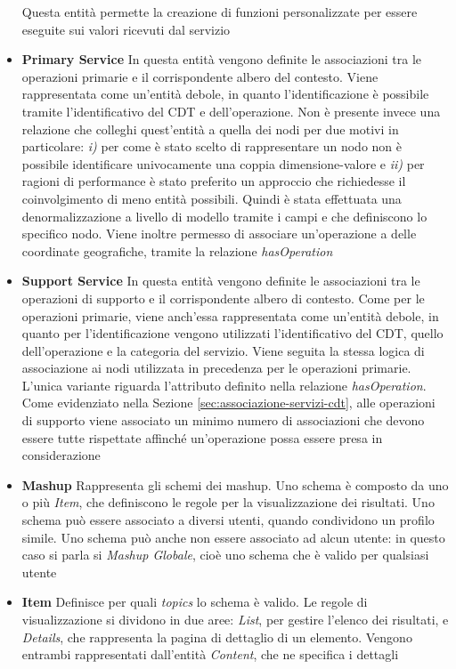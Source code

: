 \begin{itemize}
	Questa entità permette la creazione di funzioni personalizzate per essere eseguite sui valori ricevuti dal servizio
	\item \textbf{Primary Service}
	In questa entità vengono definite le associazioni tra le operazioni primarie e il corrispondente albero del contesto. Viene rappresentata come un'entità debole, in quanto l'identificazione è possibile tramite l'identificativo del CDT e dell'operazione. Non è presente invece una relazione che colleghi quest'entità a quella dei nodi per due motivi in particolare: \emph{i)} per come è stato scelto di rappresentare un nodo non è possibile identificare univocamente una coppia dimensione-valore e \emph{ii)} per ragioni di performance è stato preferito un approccio che richiedesse il coinvolgimento di meno entità possibili. Quindi è stata effettuata una denormalizzazione a livello di modello tramite i campi  e  che definiscono lo specifico nodo. Viene inoltre permesso di associare un'operazione a delle coordinate geografiche, tramite la relazione \emph{hasOperation}
	\item \textbf{Support Service}
	In questa entità vengono definite le associazioni tra le operazioni di supporto e il corrispondente albero di contesto. Come per le operazioni primarie, viene anch'essa rappresentata come un'entità debole, in quanto per l'identificazione vengono utilizzati l'identificativo del CDT, quello dell'operazione e la categoria del servizio. Viene seguita la stessa logica di associazione ai nodi utilizzata in precedenza per le operazioni primarie. L'unica variante riguarda l'attributo  definito nella relazione \emph{hasOperation}. Come evidenziato nella Sezione \ref{sec:associazione-servizi-cdt}, alle operazioni di supporto viene associato un minimo numero di associazioni che devono essere tutte rispettate affinché un'operazione possa essere presa in considerazione
	\item \textbf{Mashup}
	Rappresenta gli schemi dei mashup. Uno schema è composto da uno o più \emph{Item}, che definiscono le regole per la visualizzazione dei risultati. Uno schema può essere associato a diversi utenti, quando condividono un profilo simile. Uno schema può anche non essere associato ad alcun utente: in questo caso si parla si \emph{Mashup Globale}, cioè uno schema che è valido per qualsiasi utente
	\item \textbf{Item}
	Definisce per quali \emph{topics} lo schema è valido. Le regole di visualizzazione si dividono in due aree: \emph{List}, per gestire l'elenco dei risultati, e \emph{Details}, che rappresenta la pagina di dettaglio di un elemento. Vengono entrambi rappresentati dall'entità \emph{Content}, che ne specifica i dettagli

\end{itemize}
